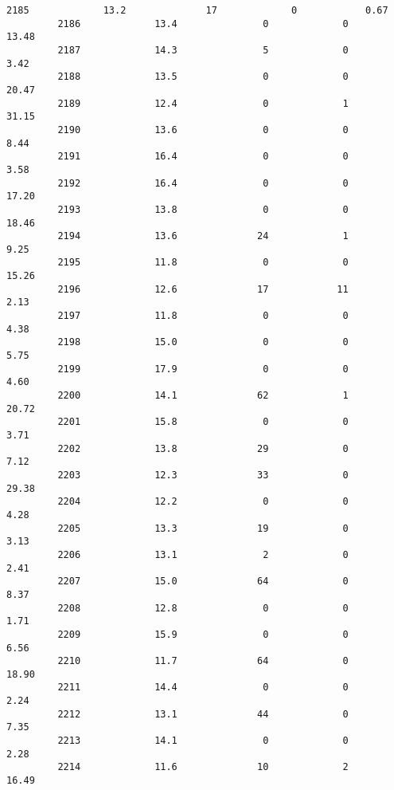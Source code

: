 \documentclass[11pt]{llncs}
\begin{document}
\begin{Verbatim}[commandchars=\\\{\}]
         2185             13.2              17             0            0.67   
         2186             13.4               0             0           13.48   
         2187             14.3               5             0            3.42   
         2188             13.5               0             0           20.47   
         2189             12.4               0             1           31.15   
         2190             13.6               0             0            8.44   
         2191             16.4               0             0            3.58   
         2192             16.4               0             0           17.20   
         2193             13.8               0             0           18.46   
         2194             13.6              24             1            9.25   
         2195             11.8               0             0           15.26   
         2196             12.6              17            11            2.13   
         2197             11.8               0             0            4.38   
         2198             15.0               0             0            5.75   
         2199             17.9               0             0            4.60   
         2200             14.1              62             1           20.72   
         2201             15.8               0             0            3.71   
         2202             13.8              29             0            7.12   
         2203             12.3              33             0           29.38   
         2204             12.2               0             0            4.28   
         2205             13.3              19             0            3.13   
         2206             13.1               2             0            2.41   
         2207             15.0              64             0            8.37   
         2208             12.8               0             0            1.71   
         2209             15.9               0             0            6.56   
         2210             11.7              64             0           18.90   
         2211             14.4               0             0            2.24   
         2212             13.1              44             0            7.35   
         2213             14.1               0             0            2.28   
         2214             11.6              10             2           16.49   
         

\end{Verbatim}
\end{document}
